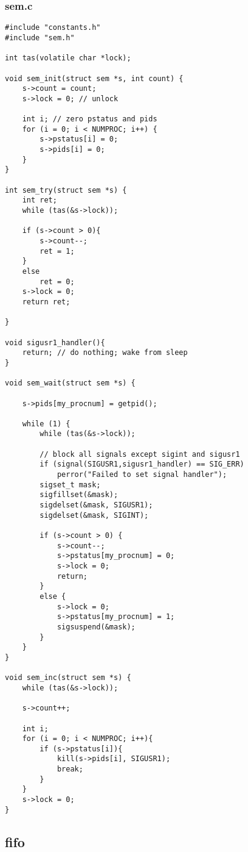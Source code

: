 \documentclass[12pt]{article}
\begin{document}
    \subsubsection{sem.c}
    \begin{lstlisting}
#include "constants.h"
#include "sem.h"

int tas(volatile char *lock);

void sem_init(struct sem *s, int count) {
    s->count = count;
    s->lock = 0; // unlock

    int i; // zero pstatus and pids
    for (i = 0; i < NUMPROC; i++) {
        s->pstatus[i] = 0;
        s->pids[i] = 0;
    }
}

int sem_try(struct sem *s) {
    int ret;
    while (tas(&s->lock));

    if (s->count > 0){
        s->count--;
        ret = 1;
    }
    else
        ret = 0;
    s->lock = 0;
    return ret;

}

void sigusr1_handler(){
    return; // do nothing; wake from sleep
}

void sem_wait(struct sem *s) {

    s->pids[my_procnum] = getpid();

    while (1) {
        while (tas(&s->lock));

        // block all signals except sigint and sigusr1
        if (signal(SIGUSR1,sigusr1_handler) == SIG_ERR)
            perror("Failed to set signal handler");
        sigset_t mask;
        sigfillset(&mask);
        sigdelset(&mask, SIGUSR1);
        sigdelset(&mask, SIGINT);

        if (s->count > 0) {
            s->count--;
            s->pstatus[my_procnum] = 0;
            s->lock = 0;
            return;
        }
        else {
            s->lock = 0;
            s->pstatus[my_procnum] = 1;
            sigsuspend(&mask);
        }
    }
}

void sem_inc(struct sem *s) {
    while (tas(&s->lock));

    s->count++;

    int i;
    for (i = 0; i < NUMPROC; i++){
        if (s->pstatus[i]){
            kill(s->pids[i], SIGUSR1);
            break;
        }
    }
    s->lock = 0;
}
    \end{lstlisting}

\subsection{fifo}
\end{document}
